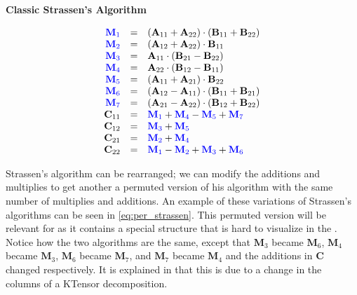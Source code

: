     \begin{center}
        \textbf{Classic Strassen's Algorithm}
        \vspace{-20pt}
    \end{center}
    \begin{equation}
        \begin{array}{rcl}
            \color{blue} \mathbf{M}_1 & = & (\mathbf{A}_{11} + \mathbf{A}_{22})\cdot (\mathbf{B}_{11} + \mathbf{B}_{22}) \\
            \color{blue} \mathbf{M}_2 & = & (\mathbf{A}_{12} + \mathbf{A}_{22})\cdot \mathbf{B}_{11} \\
            \color{blue} \mathbf{M}_3 & = & \mathbf{A}_{11}\cdot (\mathbf{B}_{21} - \mathbf{B}_{22}) \\
            \color{blue} \mathbf{M}_4 & = & \mathbf{A}_{22}\cdot (\mathbf{B}_{12} - \mathbf{B}_{11}) \\
            \color{blue} \mathbf{M}_5 & = & (\mathbf{A}_{11} + \mathbf{A}_{21})\cdot \mathbf{B}_{22} \\
            \color{blue} \mathbf{M}_6 & = & (\mathbf{A}_{12} - \mathbf{A}_{11})\cdot (\mathbf{B}_{11} + \mathbf{B}_{21}) \\
            \color{blue} \mathbf{M}_7 & = & (\mathbf{A}_{21} - \mathbf{A}_{22})\cdot (\mathbf{B}_{12} + \mathbf{B}_{22}) \\
            \mathbf{C}_{11} & = & \color{blue} \mathbf{M}_1 \color{black} + \color{blue} \mathbf{M}_4 \color{black} - \color{blue} \mathbf{M}_5 \color{black} + \color{blue} \mathbf{M}_7 \\
            \mathbf{C}_{12} & = & \color{blue} \mathbf{M}_3 \color{black} + \color{blue} \mathbf{M}_5 \\
            \mathbf{C}_{21} & = & \color{blue} \mathbf{M}_2 \color{black} + \color{blue} \mathbf{M}_4 \\
            \mathbf{C}_{22} & = & \color{blue} \mathbf{M}_1 \color{black} - \color{blue} \mathbf{M}_2 \color{black} + \color{blue} \mathbf{M}_3 \color{black} + \color{blue} \mathbf{M}_6
        \end{array}
        \label{eq:classic_strassen}
    \end{equation}

    Strassen's algorithm can be rearranged; we can modify the additions and
    multiplies to get another a permuted version of his algorithm with the same
    number of multiplies and additions. An example of these variations of
    Strassen's algorithms can be seen in \ref{eq:per_strassen}. This permuted
    version will be relevant for  as it contains a
    special structure that is hard to visualize in the
    . Notice how the two algorithms are the same,
    except that $\mathbf M_3$ became $\mathbf M_6$, $\mathbf M_4$ became
    $\mathbf M_3$, $\mathbf M_6$ became $\mathbf M_7$, and $\mathbf{M}_7$ became
    $\mathbf{M}_4$ and the additions in $\mathbf C$ changed respectively. It is
    explained in 
    that this is due to a change in the columns of a KTensor decomposition. 

